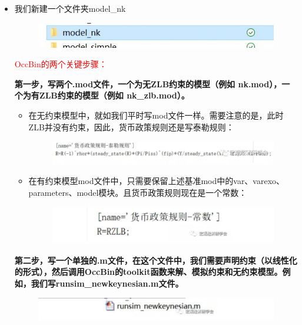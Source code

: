 \documentclass[cn,10pt,math=newtx,citestyle=gb7714-2015,bibstyle=gb7714-2015]{elegantbook}
\begin{document}
\begin{itemize}
	\item 我们新建一个文件夹model\_nk
	
	\begin{figure}[htbp!]
		\centering
		\includegraphics[width=0.8\linewidth]{FIG/modelnk}
		\centering
	\end{figure}
	
	\textcolor{red}{OccBin的两个关键步骤：}
	
	\textbf{第一步，写两个.mod文件，一个为无ZLB约束的模型（例如 nk.mod），一个为有ZLB约束的模型（例如 nk\_zlb.mod）。}
	\begin{itemize}
		\item 在无约束模型中，就如我们平时写mod文件一样。需要注意的是，此时ZLB并没有约束，因此，货币政策规则还是写泰勒规则：
		
		\begin{figure}[htbp!]
			\centering
			\includegraphics[width=0.8\linewidth]{FIG/TR}
			\centering
		\end{figure}
		
		\item 在有约束模型mod文件中，只需要保留上述基准mod中的var、varexo、parameters、model模块。且货币政策规则现在是一个常数：
		\begin{figure}[htbp!]
			\centering
			\includegraphics[width=0.8\linewidth]{FIG/TRconstant}
			\centering
		\end{figure}
	\end{itemize}
	
	\textbf{第二步，写一个单独的.m文件，在这个文件中，我们需要声明约束（以线性化的形式），然后调用OccBin的toolkit函数来解、模拟约束和无约束模型。例如，我们写runsim\_newkeynesian.m文件。}
	
	\begin{figure}[htbp!]
		\centering
		\includegraphics[width=0.8\linewidth]{FIG/mfile}
		\centering
	\end{figure}
	

\end{itemize}
\end{document}
